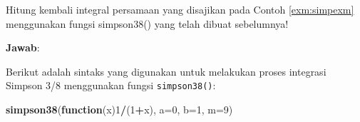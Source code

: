 \documentclass[]{book}
\newenvironment{Shaded}{\begin{snugshade}}{\end{snugshade}}
\newcommand{\CommentTok}[1]{\textcolor[rgb]{0.56,0.35,0.01}{\textit{#1}}}
\newcommand{\ControlFlowTok}[1]{\textcolor[rgb]{0.13,0.29,0.53}{\textbf{#1}}}
\newcommand{\DataTypeTok}[1]{\textcolor[rgb]{0.13,0.29,0.53}{#1}}
\newcommand{\DecValTok}[1]{\textcolor[rgb]{0.00,0.00,0.81}{#1}}
\newcommand{\KeywordTok}[1]{\textcolor[rgb]{0.13,0.29,0.53}{\textbf{#1}}}
\newcommand{\NormalTok}[1]{#1}
\newcommand{\OperatorTok}[1]{\textcolor[rgb]{0.81,0.36,0.00}{\textbf{#1}}}
\newcommand{\StringTok}[1]{\textcolor[rgb]{0.31,0.60,0.02}{#1}}
\theoremstyle{definition}
\theoremstyle{definition}
\theoremstyle{definition}
\theoremstyle{remark}
\let\BeginKnitrBlock\begin \let\EndKnitrBlock\end
\begin{document}
\begin{Shaded}
\end{Shaded}

\BeginKnitrBlock{example}
\protect\hypertarget{exm:simp38exm}{}{\label{exm:simp38exm} }Hitung kembali integral persamaan yang disajikan pada Contoh \ref{exm:simpexm} menggunakan fungsi simpson38() yang telah dibuat sebelumnya!
\EndKnitrBlock{example}

\textbf{Jawab}:

Berikut adalah sintaks yang digunakan untuk melakukan proses integrasi Simpson 3/8 menggunakan fungsi \texttt{simpson38()}:

\begin{Shaded}
\begin{Highlighting}[]
\KeywordTok{simpson38}\NormalTok{(}\ControlFlowTok{function}\NormalTok{(x)}\DecValTok{1}\OperatorTok{/}\NormalTok{(}\DecValTok{1}\OperatorTok{+}\NormalTok{x), }\DataTypeTok{a=}\DecValTok{0}\NormalTok{, }\DataTypeTok{b=}\DecValTok{1}\NormalTok{, }\DataTypeTok{m=}\DecValTok{9}\NormalTok{)}
\end{Highlighting}
\end{Shaded}
\end{document}
